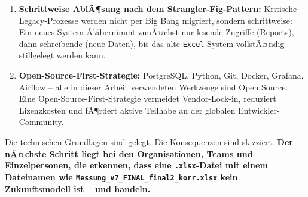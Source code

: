 ﻿\documentclass[12pt,a4paper]{report}
\theoremstyle{definition}
\theoremstyle{remark}
\newcommand{\excel}{\texttt{Excel}}
\newcommand{\code}[1]{\texttt{#1}}
\begin{document}
\begin{enumerate}[leftmargin=1.5em, itemsep=5pt]
  \item \textbf{Schrittweise AblÃ¶sung nach dem Strangler-Fig-Pattern:}
        Kritische Legacy-Prozesse werden nicht per Big Bang migriert,
        sondern schrittweise: Ein neues System Ã¼bernimmt zunÃ¤chst nur
        lesende Zugriffe (Reports), dann schreibende (neue Daten),
        bis das alte \excel-System vollstÃ¤ndig stillgelegt werden kann.

  \item \textbf{Open-Source-First-Strategie:}
        PostgreSQL, Python, Git, Docker, Grafana, Airflow --
        alle in dieser Arbeit verwendeten Werkzeuge sind Open Source.
        Eine Open-Source-First-Strategie vermeidet Vendor-Lock-in,
        reduziert Lizenzkosten und fÃ¶rdert aktive Teilhabe an der
        globalen Entwickler-Community.
\end{enumerate}

Die technischen Grundlagen sind gelegt. Die Konsequenzen sind skizziert.
\textbf{Der nÃ¤chste Schritt liegt bei den Organisationen, Teams und
Einzelpersonen, die erkennen, dass eine \code{.xlsx}-Datei mit einem
Dateinamen wie \code{Messung\_v7\_FINAL\_final2\_korr\newline .xlsx} kein
Zukunftsmodell ist -- und handeln.}
\end{document}
